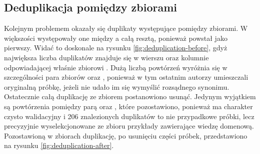 \subsection{Deduplikacja pomiędzy zbiorami}
Kolejnym problemem okazały się duplikaty występujące pomiędzy zbiorami. W większości występowały one między  a całą resztą, ponieważ  powstał jako pierwszy. Widać to doskonale na rysunku \ref{fig:deduplication-before}, gdyż największa liczba duplikatów znajduje się w wierszu oraz kolumnie odpowiadającej właśnie zbiorowi . Dużą liczbą powtórzeń wyróżnia się w szczególności para zbiorów  oraz , ponieważ w tym ostatnim autorzy umieszczali oryginalną próbkę, jeżeli nie udało im się wymyślić rozsądnego synonimu. Ostatecznie całą duplikację ze zbiorem  postanowiono usunąć. Jedynym wyjątkiem są powtórzenia pomiędzy parą  oraz , które pozostawiono, ponieważ  ma charakter czysto walidacyjny i 206 znalezionych duplikatów to nie przypadkowe próbki, lecz precyzyjnie wyselekcjonowane ze zbioru  przykłady zawierające wiedzę domenową. Pozostawioną w zbiorach duplikację, po usunięciu części próbek, przedstawiono na rysunku \ref{fig:deduplication-after}. 

